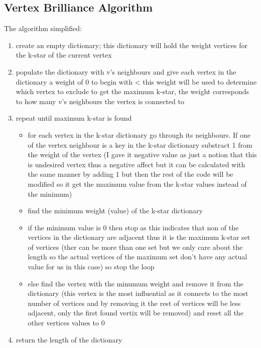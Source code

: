 \documentclass[11pt,a4paper,notitlepage]{article}
\begin{document}
\subsection{Vertex Brilliance Algorithm} \label{vba}
The algorithm simplified:
\begin{enumerate}
    \item create an empty dictionary; this dictionary will hold the weight vertices for the k-star of the current vertex 
    \item populate the dictionary with v's neighbours and give each vertex in the dictionary a weight of 0 to begin with < this weight will be used to determine which vertex to exclude to get the maximum k-star, the weight corresponds to how many v's neighbours the vertex is connected to
    \item repeat until maximum k-star is found
    \begin{itemize}
        \item for each vertex in the k-star dictionary go through its neighbours. If one of the vertex neighbour is a key in the k-star dictionary substract 1 from the weight of the vertex (I gave it negative value as just a notion that this is undesired vertex thus a negative affect but it can be calculated with the same manner by adding 1 but then the rest of the code will be modified so it get the maximum value from the k-star values instead of the minimum)
        \item find the minimum weight (value) of the k-star dictionary 
        \item if the minimum value is 0 then stop as this indicates that non of the vertices in the dictionary are adjacent thus it is the maximum k-star set of vertices (ther can be more than one set but we only care about the length so the actual vertices of the maximum set don't have any actual value for us in this case) so stop the loop
        \item else find the vertex with the minumum weight and remove it from the dictionary (this vertex is the most influential as it connects to the most number of vertices and by removing it the rest of vertices will be less adjacent, only the first found vertix will be removed) and reset all the other vertices values to 0 
    \end{itemize}
    \item return the length of the dictionary 
\end{enumerate}
\end{document}
